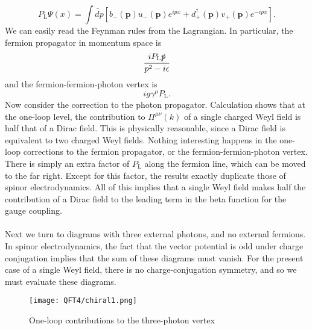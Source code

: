 \[P_{\mathrm{L}}\Psi(x) =  \int \tilde{dp} [b_-(\bm{p})u_-(\bm{p})e^{ipx} + d_+^{\dagger}(\bm{p}) v_+(\bm{p}) e^{-ipx}].\]
We can easily read the Feynman rules from the Lagrangian. In particular, the fermion propagator in momentum space is
\[\frac{iP_{\mathrm{L}}\slashed{p}}{p^2-i\epsilon}\]
and the fermion-fermion-photon vertex is
\[ig\gamma^{\mu} P_{\mathrm{L}}.\]
Now consider the correction to the photon propagator. Calculation shows that at the one-loop level, the contribution to $\Pi^{\mu\nu}(k)$ of a single charged Weyl field is half that of a Dirac field. This is physically reasonable, since a Dirac field is equivalent to two charged Weyl fields.
Nothing interesting happens in the one-loop corrections to the fermion propagator, or the fermion-fermion-photon vertex. There is simply an extra factor of $P_{\mathrm{L}}$ along the fermion line, which can be moved to the far right. Except for this factor, the results exactly duplicate those of spinor electrodynamics.
All of this implies that a single Weyl field makes half the contribution of a Dirac field to the leading term in the beta function for the gauge coupling.
\\ \\
Next we turn to diagrams with three external photons, and no external fermions. In spinor electrodynamics, the fact that the vector potential is odd under charge conjugation implies that the sum of these diagrams must vanish. For the present case of a single Weyl field, there is no charge-conjugation symmetry, and so we must evaluate these diagrams.
\begin{figure}[!h]
	\centering
	\texttt{[image: QFT4/chiral1.png]}
	\caption{One-loop contributions to the three-photon vertex}
\end{figure}

